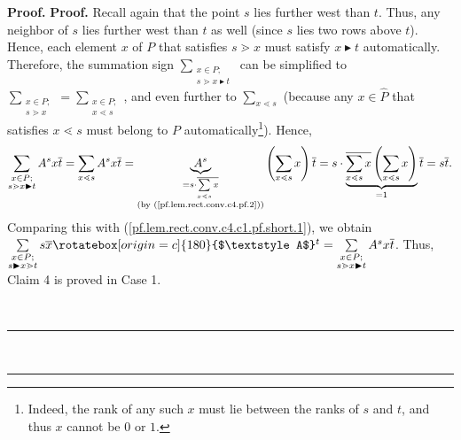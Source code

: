 \documentclass[numbers=enddot,12pt,final,onecolumn,notitlepage]{scrartcl}%
\theoremstyle{definition}
\newenvironment{vershort}{}{}
\newcommand{\upslack}{\mathchoice{\rotatebox[origin=c]{180}{$\displaystyle A$}}{\rotatebox[origin=c]{180}{$\textstyle A$}}{\rotatebox[origin=c]{180}{$\scriptstyle A$}}{\rotatebox[origin=c]{180}{$\scriptscriptstyle A$}}}
\newcommand{\downslack}{A}
\newenvironment{proof}[1][Proof]{\noindent\textbf{#1.} }{\ \rule{0.5em}{0.5em}}
\let\sumnonlimits\sum
\renewcommand{\sum}{\sumnonlimits\limits}
\begin{document}
\begin{proof}
\begin{proof}
\begin{vershort}
Recall again that the point $s$ lies further west than $t$. Thus, any neighbor
of $s$ lies further west than $t$ as well (since $s$ lies two rows above $t$).
Hence, each element $x$ of $P$ that satisfies $s\gtrdot x$ must satisfy
$x\blacktriangleright t$ automatically. Therefore, the summation sign
$\sum_{\substack{x\in P;\\s\gtrdot x\blacktriangleright t}}$ can be simplified
to $\sum_{\substack{x\in P;\\s\gtrdot x}}=\sum_{\substack{x\in P;\\x\lessdot
s}}$, and even further to $\sum_{x\lessdot s}$ (because any $x\in\widehat{P}$
that satisfies $x\lessdot s$ must belong to $P$ automatically\footnote{Indeed,
the rank of any such $x$ must lie between the ranks of $s$ and $t$, and thus
$x$ cannot be $0$ or $1$.}). Hence,%
\[
\sum_{\substack{x\in P;\\s\gtrdot x\blacktriangleright t}}\downslack^{s}%
x\overline{t}=\sum_{x\lessdot s}\downslack^{s}x\overline{t}%
=\underbrace{\downslack^{s}}_{\substack{=s\cdot\overline{\sum
\limits_{x\lessdot s}x}\\\text{(by (\ref{pf.lem.rect.conv.c4.pf.2}))}}}\left(
\sum_{x\lessdot s}x\right)  \overline{t}=s\cdot\underbrace{\overline
{\sum\limits_{x\lessdot s}x}\left(  \sum_{x\lessdot s}x\right)  }%
_{=1}\overline{t}=s\overline{t}.
\]
Comparing this with (\ref{pf.lem.rect.conv.c4.c1.pf.short.1}), we obtain
$\sum_{\substack{x\in P;\\s\blacktriangleright x\gtrdot t}}s\overline
{x}\upslack^{t}=\sum_{\substack{x\in P;\\s\gtrdot x\blacktriangleright
t}}\downslack^{s}x\overline{t}$. Thus, Claim 4 is proved in Case 1.
\end{vershort}


\end{proof}
\end{proof}
\end{document}
